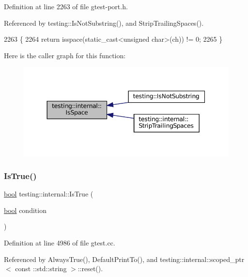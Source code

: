 Definition at line 2263 of file gtest-\/port.\+h.



Referenced by testing\+::\+Is\+Not\+Substring(), and Strip\+Trailing\+Spaces().


\begin{DoxyCode}
2263                              \{
2264   \textcolor{keywordflow}{return} isspace(static\_cast<unsigned char>(ch)) != 0;
2265 \}
\end{DoxyCode}
Here is the caller graph for this function\+:
\nopagebreak
\begin{figure}[H]
\begin{center}
\leavevmode
\includegraphics[width=344pt]{namespacetesting_1_1internal_af429e04f70f9c10f6aa76a5d1ccd389f_icgraph}
\end{center}
\end{figure}
\mbox{\label{namespacetesting_1_1internal_a527b9bcc13669b9a16400c8514266254}} 
\subsubsection{\texorpdfstring{Is\+True()}{IsTrue()}}
{\footnotesize\ttfamily \hyperlink{classbool}{bool} testing\+::internal\+::\+Is\+True (\begin{DoxyParamCaption}\item[{\hyperlink{classbool}{bool}}]{condition }\end{DoxyParamCaption})}



Definition at line 4986 of file gtest.\+cc.



Referenced by Always\+True(), Default\+Print\+To(), and testing\+::internal\+::scoped\+\_\+ptr$<$ const \+::std\+::string $>$\+::reset().


